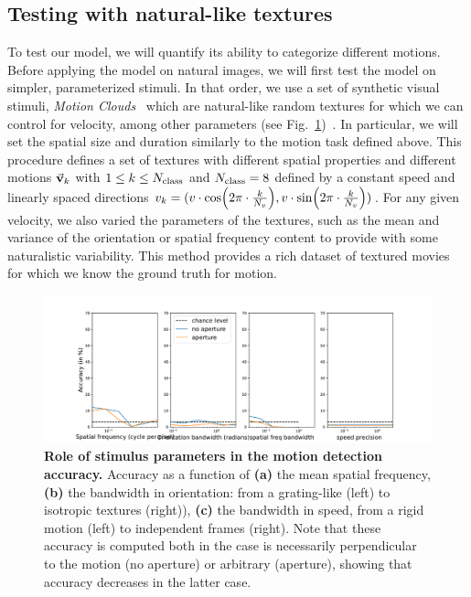 \documentclass[default]{sn-jnl}%
\theoremstyle{thmstyleone}%
\theoremstyle{thmstyletwo}%
\theoremstyle{thmstylethree}%
\newcommand{\seeFig}[1]{see Fig.~\ref{fig:#1}}%
\begin{document}
\subsection{Testing with natural-like textures}
To test our model, we will quantify its ability to categorize different motions. Before applying the model on natural images, we will first test the model on simpler, parameterized stimuli. In that order, we use a set of synthetic visual stimuli, \textit{Motion Clouds}~\citep{leon_motion_2012} which are natural-like random textures for which we can control for velocity, among other parameters (\seeFig{motion_clouds})~\citep{vacher_bayesian_2018}. In particular, we will set the spatial size and duration similarly to the motion task defined above.
This procedure defines a set of textures with different spatial properties and different motions $\va{v}_k$ with  $1 \le k \le N_\text{class}$ and $N_\text{class}=8$ defined by a constant speed and linearly spaced directions $
v_k = 
  ( 
    v \cdot \cos(2\pi\cdot \frac{k}{N_v}),
    v \cdot \sin(2\pi\cdot \frac{k}{N_v})
  )
$.
For any given velocity, we also varied the parameters of the textures, such as the mean and variance of the orientation or spatial frequency content to provide with some naturalistic variability. This method provides a rich dataset of textured movies for which we know the ground truth for motion.

\begin{figure}%
    \centering
    \includegraphics[width=0.95\linewidth]{figures/motion_clouds.pdf}
    \caption{{\bf Role of stimulus parameters in the motion detection accuracy.} Accuracy as a function of {\bf (a)} the mean spatial frequency, {\bf (b)} the bandwidth in orientation: from a grating-like (left) to isotropic textures (right)), {\bf (c)} the bandwidth in speed, from a rigid motion (left) to independent frames (right). Note that these accuracy is computed both in the case is necessarily perpendicular to the motion (no aperture) or arbitrary (aperture), showing that accuracy decreases in the latter case.}
    \label{fig:motion_clouds}
\end{figure}
\end{document}
